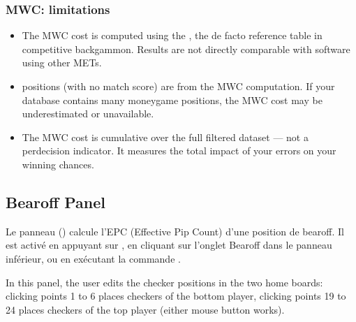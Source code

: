 \documentclass[letterpaper,10pt,english]{sphinxmanual}
\begin{document}
\subsubsection{MWC: limitations}
\label{\detokenize{manuel:mwc-limitations}}\begin{itemize}
\item {} 
\sphinxAtStartPar
The MWC cost is computed using the , the de facto reference table in competitive backgammon. Results are not directly comparable with software using other METs.

\item {} 
\sphinxAtStartPar
{} positions (with no match score) are  from the MWC computation. If your database contains many money\sphinxhyphen{}game positions, the MWC cost may be underestimated or unavailable.

\item {} 
\sphinxAtStartPar
The MWC cost is cumulative over the full filtered dataset — not a per\sphinxhyphen{}decision indicator. It measures the total impact of your errors on your winning chances.

\end{itemize}


\subsection{Bearoff Panel}
\label{\detokenize{manuel:panneau-bearoff}}\label{\detokenize{manuel:panneau-epc}}
\sphinxAtStartPar
Le panneau  () calcule l’EPC (Effective Pip Count) d’une
position de bearoff. Il est activé en appuyant sur , en cliquant sur
l’onglet Bearoff dans le panneau inférieur, ou en exécutant la commande
.

\sphinxAtStartPar
In this panel, the user edits the checker positions in the two home boards: clicking points 1 to 6 places checkers of the bottom player, clicking points 19 to 24 places checkers of the top player (either mouse button works).
\end{document}
